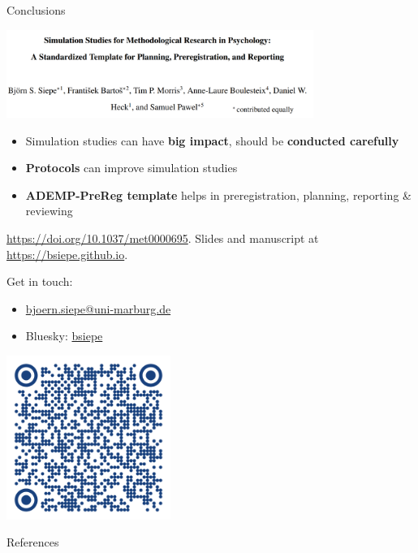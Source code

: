 \documentclass[english, 12pt, aspectratio=169]{beamer}
\begin{document}
\begin{frame}{Conclusions}

  \begin{block}{}
    \centering
    \includegraphics[width = 0.75\textwidth,frame]{pics/siepeetal.png}

    \begin{itemize}
    \pause
      \item Simulation studies can have \alert{\textbf{big impact}}, should be
            \alert{\textbf{conducted carefully}}
      \pause
      \item \alert{\textbf{Protocols}} can improve simulation studies
      \pause
      \item \alert{\textbf{ADEMP-PreReg template}} helps in preregistration,
            planning, reporting \& reviewing
      \pause
    \end{itemize}
  \end{block}

  {\tiny \color{gray} \href{https://doi.org/10.1037/met0000695}{https://doi.org/10.1037/met0000695}. Slides and manuscript at \href{https://bsiepe.github.io}{https://bsiepe.github.io}.}
\end{frame}

\begin{frame}
Get in touch: 
\begin{itemize}
\item \faEnvelope \hspace{0.1em} \href{mailto:bjoern.siepe@uni-marburg.de)}{bjoern.siepe@uni-marburg.de}
\item Bluesky: \hspace{0.1em} \href{https://bsky.app/profile/bsiepe.bsky.social}{bsiepe}
\end{itemize}


\includegraphics[width = 0.4\textwidth]{pics/dagstat_qr.png}
\end{frame}


\begin{frame}[allowframebreaks]{References}
\scriptsize
  
  
\end{frame}
\end{document}
